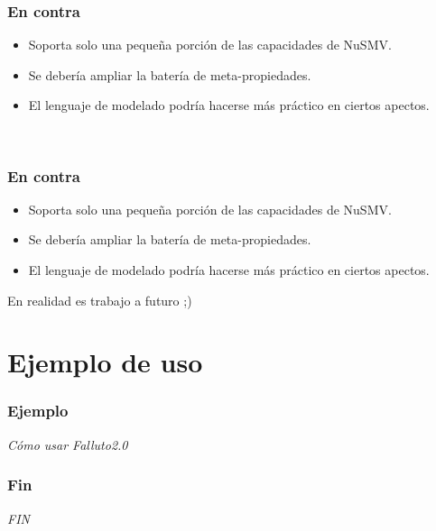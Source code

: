 \documentclass[serif]{beamer}
\begin{document}
\begin{frame}
\frametitle{En contra}
\begin{itemize}\itemsep15pt
\item Soporta solo una pequeña porción de las capacidades de NuSMV.
\item Se debería ampliar la batería de meta-propiedades.
\item El lenguaje de modelado podría hacerse más práctico en ciertos apectos.
\end{itemize}
\vspace{15pt}
\begin{center}{\LARGE ~}\end{center}
\end{frame}


\begin{frame}
\frametitle{En contra}
\begin{itemize}\itemsep15pt
\item Soporta solo una pequeña porción de las capacidades de NuSMV.
\item Se debería ampliar la batería de meta-propiedades.
\item El lenguaje de modelado podría hacerse más práctico en ciertos apectos.
\end{itemize}
\vspace{15pt}
\begin{center}{\color{red} \LARGE En realidad es trabajo a futuro ;)}\end{center}
\end{frame}



\section[Ejemplo]{Ejemplo de uso}
\begin{frame}
\frametitle{Ejemplo}
\begin{center}{\LARGE \emph{Cómo usar Falluto2.0}}\end{center}
\end{frame}




\begin{frame}
\frametitle{Fin}
\begin{center}{\LARGE \emph{FIN}}\end{center}
\end{frame}


\end{document}
